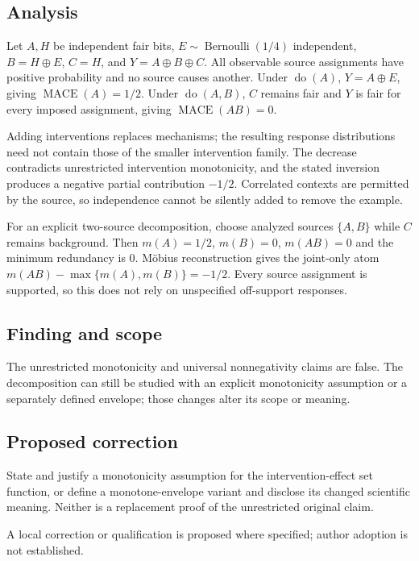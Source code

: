 \documentclass[11pt]{article}
\begin{document}
\subsection*{Analysis}

Let \(A,H\) be independent fair bits, \(E\sim\operatorname{Bernoulli}(1/4)\) independent, \(B=H\oplus E\), \(C=H\), and \(Y=A\oplus B\oplus C\). All observable source assignments have positive probability and no source causes another. Under \(\operatorname{do}(A)\), \(Y=A\oplus E\), giving \(\operatorname{MACE}(A)=1/2\). Under \(\operatorname{do}(A,B)\), \(C\) remains fair and \(Y\) is fair for every imposed assignment, giving \(\operatorname{MACE}(AB)=0\).

Adding interventions replaces mechanisms; the resulting response distributions need not contain those of the smaller intervention family. The decrease contradicts unrestricted intervention monotonicity, and the stated inversion produces a negative partial contribution \(-1/2\). Correlated contexts are permitted by the source, so independence cannot be silently added to remove the example.

For an explicit two-source decomposition, choose analyzed sources \(\{A,B\}\) while \(C\) remains background. Then \(m(A)=1/2\), \(m(B)=0\), \(m(AB)=0\) and the minimum redundancy is \(0\). Möbius reconstruction gives the joint-only atom \(m(AB)-\max\{m(A),m(B)\}=-1/2\). Every source assignment is supported, so this does not rely on unspecified off-support responses.

\subsection*{Finding and scope}

The unrestricted monotonicity and universal nonnegativity claims are false. The decomposition can still be studied with an explicit monotonicity assumption or a separately defined envelope; those changes alter its scope or meaning.

\subsection*{Proposed correction}

State and justify a monotonicity assumption for the intervention-effect set function, or define a monotone-envelope variant and disclose its changed scientific meaning. Neither is a replacement proof of the unrestricted original claim.

A local correction or qualification is proposed where specified; author adoption is not established.
\end{document}
